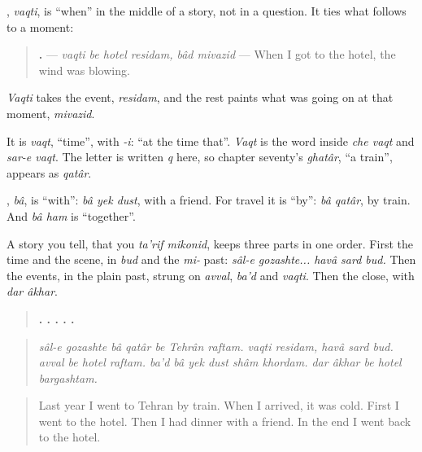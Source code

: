 \begin{grammarlens}[title={Grammar Lens: vaqti, the joint for a moment}]
\textbf{}, \emph{vaqti}, is \textquotedblleft{}when\textquotedblright{} in the middle of a story, not in a question. It ties what follows to a moment:

\begin{quote}
\textbf{     .} — \emph{vaqti be hotel residam, bâd mivazid} — When I got to the hotel, the wind was blowing.
\end{quote}

\emph{Vaqti} takes the event, \emph{residam}, and the rest paints what was going on at that moment, \emph{mivazid}.

It is \emph{vaqt}, \textquotedblleft{}time\textquotedblright{}, with \emph{-i}: \textquotedblleft{}at the time that\textquotedblright{}. \emph{Vaqt} is the word inside \emph{che vaqt} and \emph{sar-e vaqt}. The letter \textbf{} is written \emph{q} here, so chapter seventy's \emph{ghatâr}, \textquotedblleft{}a train\textquotedblright{}, appears as \emph{qatâr}.
\end{grammarlens}

\begin{grammarlens}[title={Grammar Lens: bâ, \textquotedblleft{}with\textquotedblright{}}]
\textbf{}, \emph{bâ}, is \textquotedblleft{}with\textquotedblright{}: \emph{bâ yek dust}, with a friend. For travel it is \textquotedblleft{}by\textquotedblright{}: \emph{bâ qatâr}, by train. And \emph{bâ ham} is \textquotedblleft{}together\textquotedblright{}.
\end{grammarlens}

\begin{grammarlens}[title={Grammar Lens: the order a told story keeps}]
A story you tell, that you \emph{ta'rif mikonid}, keeps three parts in one order. First the time and the scene, in \emph{bud} and the \emph{mi-} past: \emph{sâl-e gozashte... havâ sard bud.} Then the events, in the plain past, strung on \emph{avval}, \emph{ba'd} and \emph{vaqti}. Then the close, with \emph{dar âkhar}.

\begin{quote}
\textbf{      .     .    .      .     .}
\end{quote}

\begin{quote}
\emph{sâl-e gozashte bâ qatâr be Tehrân raftam. vaqti residam, havâ sard bud. avval be hotel raftam. ba'd bâ yek dust shâm khordam. dar âkhar be hotel bargashtam.}
\end{quote}

\begin{quote}
Last year I went to Tehran by train. When I arrived, it was cold. First I went to the hotel. Then I had dinner with a friend. In the end I went back to the hotel.
\end{quote}
\end{grammarlens}

